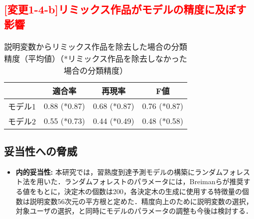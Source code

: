 \documentclass[submit]{ipsj}
\begin{document}
{\subsection{\textcolor{red}{[変更1-4-b]リミックス作品がモデルの精度に及ぼす影響}}

\begin{table}[t]
\color{red}
        \begin{center}
        \caption{説明変数からリミックス作品を除去した場合の分類精度（平均値）（*リミックス作品を除去しなかった場合の分類精度）}\label{tab:add_analysis}
            \begin{tabular}{l|p{20mm}|p{20mm}|p{20mm}}
                \hline
                & \multicolumn{1}{c|}{適合率} & \multicolumn{1}{c|}{再現率} & \multicolumn{1}{c}{F値} \\ \hline
                モデル1 & 0.88 (*0.87) & 0.68 (*0.87) & 0.76 (*0.87) \\
                モデル2 & 0.55 (*0.73) & 0.44 (*0.49) & 0.48 (*0.58) \\ 
                \hline
            \end{tabular}
        \end{center}
\color{black}
\end{table}

\textcolor{red}{}

\textcolor{red}{}


\subsection{妥当性への脅威}
\begin{itemize}
\item \textbf{内的妥当性: }本研究では，習熟度到達予測モデルの構築にランダムフォレスト法を用いた．ランダムフォレストのパラメータには，Breimanらが推奨する値をもとに，決定木の個数は200，各決定木の生成に使用する特徴量の個数は説明変数56次元の平方根と定めた．精度向上のために説明変数の選択，対象ユーザの選択，と同時にモデルのパラメータの調整も今後は検討する．


\end{itemize}}
\end{document}
